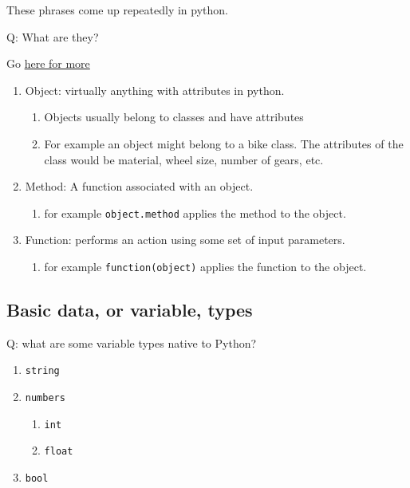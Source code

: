 \documentclass[11pt]{article}
\providecommand{\tightlist}{%
      \setlength{\itemsep}{0pt}\setlength{\parskip}{0pt}}
\begin{document}
These phrases come up repeatedly in python.

Q: What are they?

Go
\href{https://www.geeksforgeeks.org/difference-method-function-python/}{here
for more}

\begin{enumerate}
\def\labelenumi{\arabic{enumi}.}
\tightlist
\item
  Object: virtually anything with attributes in python.

  \begin{enumerate}
  \def\labelenumii{\arabic{enumii}.}
  \tightlist
  \item
    Objects usually belong to classes and have attributes
  \item
    For example an object might belong to a bike class. The attributes
    of the class would be material, wheel size, number of gears, etc.
  \end{enumerate}
\item
  Method: A function associated with an object.

  \begin{enumerate}
  \def\labelenumii{\alph{enumii}.}
  \tightlist
  \item
    for example \texttt{object.method} applies the method to the object.
  \end{enumerate}
\item
  Function: performs an action using some set of input parameters.

  \begin{enumerate}
  \def\labelenumii{\alph{enumii}.}
  \setcounter{enumii}{1}
  \tightlist
  \item
    for example \texttt{function(object)} applies the function to the
    object.
  \end{enumerate}
\end{enumerate}

    \subsection{Basic data, or variable,
types}\label{basic-data-or-variable-types}

Q: what are some variable types native to Python?

\begin{enumerate}
\def\labelenumi{\arabic{enumi}.}
\tightlist
\item
  \texttt{string}
\item
  \texttt{numbers}

  \begin{enumerate}
  \def\labelenumii{\arabic{enumii}.}
  \tightlist
  \item
    \texttt{int}
  \item
    \texttt{float}
  \end{enumerate}
\item
  \texttt{bool}
\end{enumerate}
\end{document}
